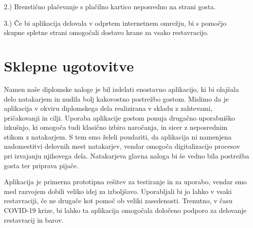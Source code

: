 \documentclass[a4paper, 12pt]{book}
\begin{document}
2.) Brezstično plačevanje s plačilno kartico neposredno na strani gosta.

3.) Če bi aplikacija delovala v odprtem internetnem omrežju, bi s pomočjo skupne spletne strani omogočali dostavo hrane za vsako restavracijo.



\chapter {Sklepne ugotovitve}
Namen naše diplomske naloge je bil izdelati enostavno aplikacijo, ki bi olajšala delo natakarjem in nudila bolj kakovostno postrežbo gostom. Mislimo da je aplikacija v okviru diplomskega dela realizirana v skladu z zahtevami, pričakovanji in cilji. Uporaba aplikacije gostom ponuja drugačno uporabniško izkušnjo, ki omogoča tudi klasično izbiro naročanja, in sicer z neposrednim stikom z natakarjem. S tem smo želeli poudariti, da aplikacija ni namenjena nadomestitvi delovnih mest natakarjev, vendar omogoča digitalizacijo procesov pri izvajanju njihovega dela. Natakarjeva glavna naloga bi še vedno bila postrežba gosta ter priprava pijače. 

Aplikacija je primerna prototipna rešitev za testiranje in za uporabo, vendar smo med razvojem dobili veliko idej za izboljšavo. Uporabljali bi jo lahko v vsaki restavraciji, če ne drugače kot pomoč ob veliki zasedenosti. Trenutno, v času COVID-19 krize, bi lahko ta aplikacija omogočala določeno podporo za delovanje restavracij in barov. 


\newpage %
\ \\
\clearpage
{}


\end{document}
